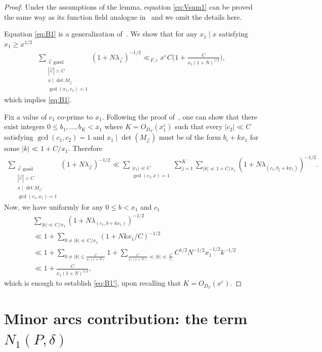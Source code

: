 \documentclass[letterpaper,11pt]{amsart}
\numberwithin{equation}{section}
\theoremstyle{definition}
\numberwithin{equation}{section}
\newcommand{\uc}{{\vec{\mathrm{c}}}}
\begin{document}
\begin{proof}
Under the assumptions of the lemma,	equation \eqref{eq:Vsum1} can be proved the same way as its function field analogue in~\cite[eq. (8.6)]{V19} and we omit the details here. 

Equation \eqref{eq:B1} is a generalization of~\cite[eq. (8.7)]{V19}. We show that for any $x_1\mid x$ satisfying $x_1\geq x^{1/2}$
\begin{align}\label{eq:B1'}
	\sum_{\substack{\uc\textrm{ good }\\|\uc|\asymp C\\ x\mid \det M_{\uc}\\\gcd(x_1,c_1)=1}}(1+N\lambda_\uc)^{-1/2}\ll_{F, \varepsilon} x^\varepsilon C \Big(1+ \frac{C}{x_1(1+N)^{1/2}}\Big),
	\end{align}
	which implies \eqref{eq:B1}. 

	   Fix a value of $c_1$ co-prime to $x_1$. Following the proof of~\cite[eq. (8.7)]{V19}, one can show that there exist integers $0\leq b_1,...,b_K<x_1$ where $ K=O_{D_F}(x_1^\varepsilon)$ such that every $|c_2|\ll C$ satisfying $\gcd(c_1,c_2)=1$ and $x_1\mid \det(M_\uc)$ must be of the form $b_i+kx_1 $ for some $|k|\ll 1+C/x_1$. Therefore
	\begin{align*}
	\sum_{\substack{\uc\textrm{ good }\\|\uc|\asymp C\\ x\mid \det M_{\uc}\\ \gcd(c_1,x_1)=1}}(1+N\lambda_\uc)^{-1/2}\ll \sum_{\substack{|c_1|\ll C\\ \gcd(c_1,x)=1}}\sum_{j=1}^K \sum_{|k|\ll 1+C/x_1}(1+N\lambda_{(c_1,b_j+kx_1)})^{-1/2}.
	\end{align*}
	Now, we have uniformly for any $0\leq b<x_1$ and $c_1 $
	\begin{align*}
	&\sum_{|k|\ll C/x_1}(1+N\lambda_{(c_1,b+kx_1)})^{-1/2}
	\\&\ll 1+\sum_{0\not=|k|\ll C/x_1}(1+Nkx_1/C)^{-1/2}\\
	&\ll 1+\sum_{0\not=|k|\leq \frac{C}{x_1(1+N)}}1+\sum_{\frac{C}{x_1(1+N)}\ll |k|\ll \frac{C}{x_1}} C^{1/2}N^{-1/2}x_1^{-1/2}k^{-1/2}
	\\&\ll1+ \frac{C}{x_1(1+N)^{1/2}},
	\end{align*}
 which is enough to establish \eqref{eq:B1'}, upon recalling that $K=O_{D_F}(x^\varepsilon)$.
\end{proof}



	\section{Minor arcs contribution: the term \texorpdfstring{$N_1(P, \delta)$}{N1(P,δ)}} \label{sec:N1}
\end{document}
